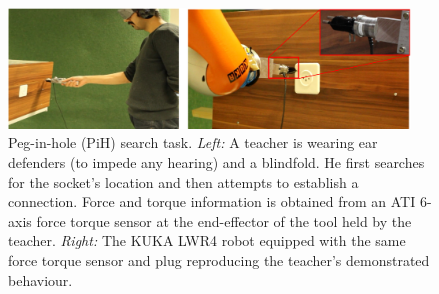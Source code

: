 \begin{figure}[h]
  \centering
  \includegraphics[width=0.95\textwidth]{./ch4-PiH/Figures/Fig/human_example_search.pdf}
  \caption{Peg-in-hole (PiH) search task. \textit{Left:} A teacher is wearing ear defenders (to impede any hearing) and 
  a blindfold. He first searches for the socket's location and then attempts to establish a connection. Force 
  and torque information is obtained from an ATI 6-axis force torque sensor at the end-effector of the tool held by the teacher.
  \textit{Right:} The KUKA LWR4 robot equipped with the same force torque sensor and plug reproducing the teacher's demonstrated behaviour.}
  \label{fig:experiment_setup}
\end{figure}



